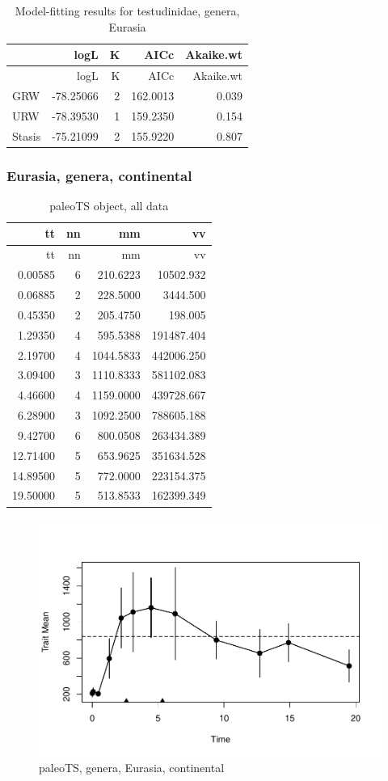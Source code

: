 \documentclass[]{article}
\begin{document}
\begin{longtable}[]{@{}lrrrr@{}}
\caption{Model-fitting results for testudinidae, genera,
Eurasia}\tabularnewline
\toprule
& logL & K & AICc & Akaike.wt\tabularnewline
\midrule
\endfirsthead
\toprule
& logL & K & AICc & Akaike.wt\tabularnewline
\midrule
\endhead
GRW & -78.25066 & 2 & 162.0013 & 0.039\tabularnewline
URW & -78.39530 & 1 & 159.2350 & 0.154\tabularnewline
Stasis & -75.21099 & 2 & 155.9220 & 0.807\tabularnewline
\bottomrule
\end{longtable}

\newpage 

\subsubsection{Eurasia, genera,
continental}\label{eurasia-genera-continental}

\begin{longtable}[]{@{}rrrr@{}}
\caption{paleoTS object, all data}\tabularnewline
\toprule
tt & nn & mm & vv\tabularnewline
\midrule
\endfirsthead
\toprule
tt & nn & mm & vv\tabularnewline
\midrule
\endhead
0.00585 & 6 & 210.6223 & 10502.932\tabularnewline
0.06885 & 2 & 228.5000 & 3444.500\tabularnewline
0.45350 & 2 & 205.4750 & 198.005\tabularnewline
1.29350 & 4 & 595.5388 & 191487.404\tabularnewline
2.19700 & 4 & 1044.5833 & 442006.250\tabularnewline
3.09400 & 3 & 1110.8333 & 581102.083\tabularnewline
4.46600 & 4 & 1159.0000 & 439728.667\tabularnewline
6.28900 & 3 & 1092.2500 & 788605.188\tabularnewline
9.42700 & 6 & 800.0508 & 263434.389\tabularnewline
12.71400 & 5 & 653.9625 & 351634.528\tabularnewline
14.89500 & 5 & 772.0000 & 223154.375\tabularnewline
19.50000 & 5 & 513.8533 & 162399.349\tabularnewline
\bottomrule
\end{longtable}

\begin{figure}[htbp]
\centering
\includegraphics{MA_JJ_files/figure-latex/pTSEsC-1.pdf}
\caption{paleoTS, genera, Eurasia, continental}
\end{figure}
\end{document}
